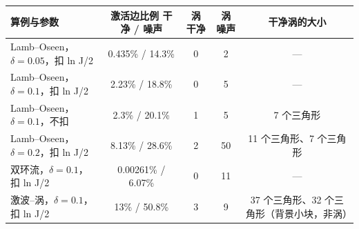 \begin{tabular}{lcccc}\toprule 算例与参数 & 激活边比例 干净 / 噪声 & 涡 干净 & 涡 噪声 & 干净涡的大小 \\\midrule
Lamb–Oseen，$\delta=0.05$，扣 ln J/2 & 0.435\% / 14.3\% & 0 & 2 & —\\
Lamb–Oseen，$\delta=0.1$，扣 ln J/2 & 2.23\% / 18.8\% & 0 & 5 & —\\
Lamb–Oseen，$\delta=0.1$，不扣 & 2.3\% / 20.1\% & 1 & 5 & 7 个三角形\\
Lamb–Oseen，$\delta=0.2$，扣 ln J/2 & 8.13\% / 28.6\% & 2 & 50 & 11 个三角形、7 个三角形\\
双环流，$\delta=0.1$，扣 ln J/2 & 0.00261\% / 6.07\% & 0 & 11 & —\\
激波–涡，$\delta=0.1$，扣 ln J/2 & 13\% / 50.8\% & 3 & 9 & 37 个三角形、32 个三角形（背景小块，非涡）\\
\bottomrule\end{tabular}